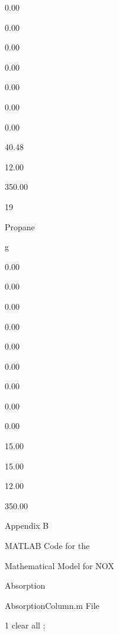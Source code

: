 \documentclass[a4paper,portrait,12pt]{article}
\begin{document}
0.00


0.00


0.00


0.00


0.00


0.00


0.00


40.48


12.00


350.00





19


\begin{flushleft}
Propane
\end{flushleft}


\begin{flushleft}
g
\end{flushleft}


0.00


0.00


0.00


0.00


0.00


0.00


0.00


0.00


0.00


15.00


15.00


12.00


350.00





\begin{flushleft}
\newpage
Appendix B
\end{flushleft}





\begin{flushleft}
MATLAB Code for the
\end{flushleft}


\begin{flushleft}
Mathematical Model for NOX
\end{flushleft}


\begin{flushleft}
Absorption
\end{flushleft}


\begin{flushleft}
AbsorptionColumn.m File
\end{flushleft}


\begin{flushleft}
1 clear all ;
\end{flushleft}
\end{document}
